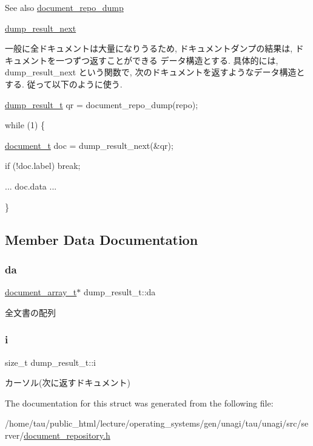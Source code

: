 \begin{DoxySeeAlso}{See also}
\hyperlink{document__repository_8h_a668ef0ea9ec3a0ca0bcb98b2406eb477}{document\+\_\+repo\+\_\+dump} 

\hyperlink{document__repository_8h_a2db0fd4b412e33d8bf3549feb98b22fb}{dump\+\_\+result\+\_\+next}
\end{DoxySeeAlso}
一般に全ドキュメントは大量になりうるため, ドキュメントダンプの結果は, ドキュメントを一つずつ返すことができる データ構造とする. 具体的には, dump\+\_\+result\+\_\+next という関数で, 次のドキュメントを返すようなデータ構造とする. 従って以下のように使う.

\hyperlink{structdump__result__t}{dump\+\_\+result\+\_\+t} qr = document\+\_\+repo\+\_\+dump(repo);

while (1) \{

\hyperlink{structdocument__t}{document\+\_\+t} doc = dump\+\_\+result\+\_\+next(\&qr);

if (!doc.label) break;

... doc.\+data ...

\} 

\subsection{Member Data Documentation}
\mbox{\label{structdump__result__t_a8bec8965013def292a9ead629d8939a5}} 
\subsubsection{\texorpdfstring{da}{da}}
{\footnotesize\ttfamily \hyperlink{structdocument__array__t}{document\+\_\+array\+\_\+t}$\ast$ dump\+\_\+result\+\_\+t\+::da}

全文書の配列 \mbox{\label{structdump__result__t_ab5747e1016ae99e9dd3aaf13099572c7}} 
\subsubsection{\texorpdfstring{i}{i}}
{\footnotesize\ttfamily size\+\_\+t dump\+\_\+result\+\_\+t\+::i}

カーソル(次に返すドキュメント) 

The documentation for this struct was generated from the following file\+:\begin{DoxyCompactItemize}
\item 
/home/tau/public\+\_\+html/lecture/operating\+\_\+systems/gen/unagi/tau/unagi/src/server/\hyperlink{document__repository_8h}{document\+\_\+repository.\+h}\end{DoxyCompactItemize}
